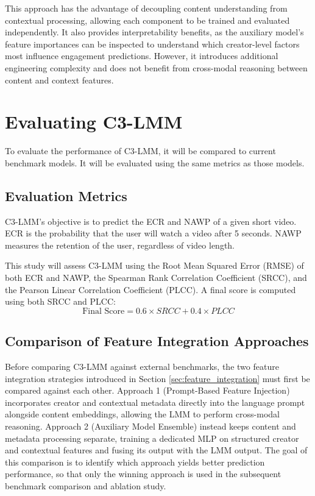 This approach has the advantage of decoupling content understanding from contextual processing, allowing each component to be trained and evaluated independently. It also provides interpretability benefits, as the auxiliary model's feature importances can be inspected to understand which creator-level factors most influence engagement predictions. However, it introduces additional engineering complexity and does not benefit from cross-modal reasoning between content and context features.

\section{Evaluating C3-LMM}

To evaluate the performance of C3-LMM, it will be compared to current benchmark models. It will be evaluated using the same metrics as those models.

\subsection{Evaluation Metrics}

C3-LMM's objective is to predict the ECR and NAWP of a given short video. ECR is the probability that the user will watch a video after 5 seconds. NAWP measures the retention of the user, regardless of video length.

This study will assess C3-LMM using the Root Mean Squared Error (RMSE) of both ECR and NAWP, the Spearman Rank Correlation Coefficient (SRCC), and the Pearson Linear Correlation Coefficient (PLCC). A final score is computed using both SRCC and PLCC: 
\begin{equation}
    \text{Final Score} = 0.6\times SRCC + 0.4\times PLCC
\end{equation}

\subsection{Comparison of Feature Integration Approaches}

Before comparing C3-LMM against external benchmarks, the two feature integration strategies introduced in Section \ref{sec:feature_integration} must first be compared against each other. Approach 1 (Prompt-Based Feature Injection) incorporates creator and contextual metadata directly into the language prompt alongside content embeddings, allowing the LMM to perform cross-modal reasoning. Approach 2 (Auxiliary Model Ensemble) instead keeps content and metadata processing separate, training a dedicated MLP on structured creator and contextual features and fusing its output with the LMM output. The goal of this comparison is to identify which approach yields better prediction performance, so that only the winning approach is used in the subsequent benchmark comparison and ablation study.

